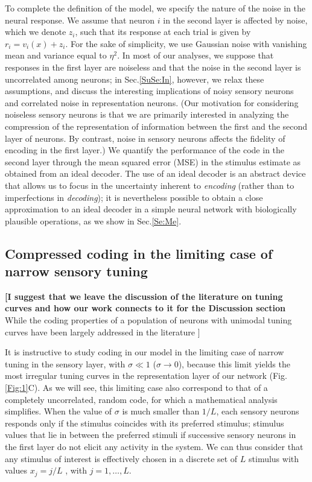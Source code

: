 \documentclass[a4paper]{article}%
\begin{document}
To complete the definition of the model, we specify the nature of the noise in
the neural response. We assume that neuron $i$ in the second layer is affected
by noise, which we denote $z_{i}$, such that its response at each trial is
given by $r_{i}=v_{i}\left(  x\right)  +z_{i}$. For the sake of simplicity, we
use Gaussian noise with vanishing mean and variance equal to $\eta^{2}$. In
most of our analyses, we suppose that responses in the first layer are
noiseless and that the noise in the second layer is uncorrelated among
neurons; in Sec.\ref{SuSe:In}, however, we relax these assumptions, and
discuss the interesting implications of noisy sensory neurons and correlated
noise in representation neurons. (Our motivation for considering noiseless
sensory neurons is that we are primarily interested in analyzing the
compression of the representation of information between the first and the
second layer of neurons. By contrast, noise in sensory neurons affects the
fidelity of encoding in the first layer.) We quantify the performance of the
code in the second layer through the mean squared error (MSE) in the stimulus
estimate as obtained from an ideal decoder. The use of an ideal decoder is an
abstract device that allows us to focus in the uncertainty inherent to
\textit{encoding} (rather than to imperfections in \textit{decoding}); it is
nevertheless possible to obtain a close approximation to an ideal decoder in a
simple neural network with biologically plausible operations, as we show in
Sec.\ref{Se:Me}.

\subsection{Compressed coding in the limiting case of narrow sensory tuning}

\textbf{[I suggest that we leave the discussion of the literature on tuning
curves and how our work connects to it for the Discussion section }While the
coding properties of a population of neurons with unimodal tuning curves have
been largely addressed in the literature
\cite{Zhang1999NeuronalBroaden,Montemurro2006OptimalVariables,Yaeli2010Error-basedNeurons}%
]

It is instructive to study coding in our model in the limiting case of narrow
tuning in the sensory layer, with $\sigma\ll1$ ($\sigma\rightarrow0$), because
this limit yields the most irregular tuning curves in the representation layer
of our network (Fig. \ref{Fig:1}C). As we will see, this limiting case also
correspond to that of a completely uncorrelated, random code, for which a
mathematical analysis simplifies. When the value of $\sigma$ is much smaller
than $1/L$, each sensory neurons responds only if the stimulus coincides with
its preferred stimulus; stimulus values that lie in between the preferred
stimuli if successive sensory neurons in the first layer do not elicit any
activity in the system. We can thus consider that any stimulus of interest is
effectively chosen in a discrete set of $L$ stimulus with values $x_{j}=j/L$ ,
with $j=1,\ldots,L$.
\end{document}
